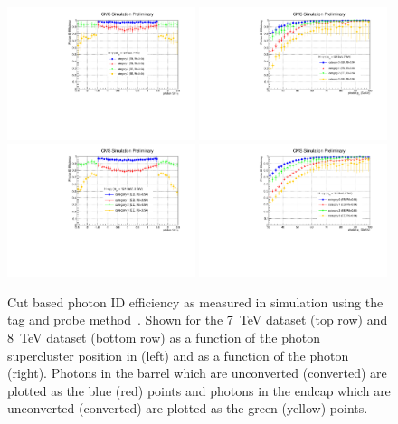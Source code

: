 \begin{figure}
  \includegraphics[width=0.49\textwidth]{selec_and_cats/plots/eff_7TeV_eta.pdf}
  \includegraphics[width=0.49\textwidth]{selec_and_cats/plots/eff_7TeV_pt.pdf}
  \includegraphics[width=0.49\textwidth]{selec_and_cats/plots/eff_8TeV_eta.pdf}
  \includegraphics[width=0.49\textwidth]{selec_and_cats/plots/eff_8TeV_pt.pdf}
  \caption[Cut based photon ID efficiency as measured in \Zee \acs{MC} simulation]{Cut based photon ID efficiency as measured in \Zee \MC simulation using the tag and probe method~\cite{tag_and_probe}. Shown for the 7~TeV dataset (top row) and 8~TeV dataset (bottom row) as a function of the photon supercluster position in \eta (left) and as a function of the photon \pT (right). Photons in the barrel which are unconverted (converted) are plotted as the blue (red) points and photons in the endcap which are unconverted (converted) are plotted as the green (yellow) points.}
  \label{fig:cic_efficiency}
\end{figure}

